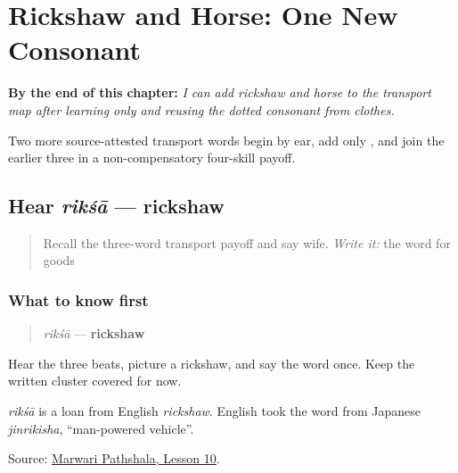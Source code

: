 
\chapter{Rickshaw and Horse: One New Consonant}
\label{ch:mw-transport-five}

\begin{chapteropening}
\textbf{By the end of this chapter:} \emph{I can add rickshaw and horse to the transport map after learning only  and reusing the dotted consonant from clothes.}

Two more source-attested transport words begin by ear, add only , and join the earlier three in a non-compensatory four-skill payoff.
\end{chapteropening}

\section[rikśā]{Hear \emph{rikśā} — rickshaw}

\label{lesson:MW-C17-hear-riksha}



\begin{quote}
Recall the three-word transport payoff and say wife. \emph{Write it:} the word for goods
\end{quote}

\subsection*{What to know first}
\begin{quote}
\emph{rikśā} — \textbf{rickshaw}
\end{quote}

Hear the three beats, picture a rickshaw, and say the word once. Keep the written cluster covered for now.

\begin{cousinweb}
\emph{rikśā} is a loan from English \emph{rickshaw}. English took the word from Japanese \emph{jinrikisha}, \textquotedblleft{}man-powered vehicle\textquotedblright{}.
\end{cousinweb}

\begin{tcolorbox}[breakable,colback=teal!4,colframe=teal!35!black,title={Before you move on}]
Source: \href{https://www.marwaripathshala.com/marwari-lesson-10-english}{Marwari Pathshala, Lesson 10}.
\end{tcolorbox}
